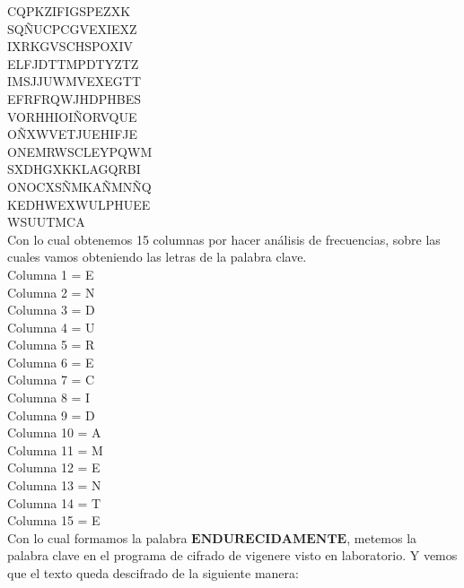 \documentclass[12pt, letterpaper]{article}
\begin{document}
CQPKZIFIGSPEZXK\\
SQÑUCPCGVEXIEXZ\\
IXRKGVSCHSPOXIV\\
ELFJDTTMPDTYZTZ\\
IMSJJUWMVEXEGTT\\
EFRFRQWJHDPHBES\\
VORHHIOIÑORVQUE\\
OÑXWVETJUEHIFJE\\
ONEMRWSCLEYPQWM\\
SXDHGXKKLAGQRBI\\
ONOCXSÑMKAÑMNÑQ\\
KEDHWEXWULPHUEE\\
WSUUTMCA\\

Con lo cual obtenemos 15 columnas por hacer análisis de frecuencias, sobre las cuales vamos obteniendo las letras de la palabra clave.\\

Columna 1 = E\\
Columna 2 = N\\
Columna 3 = D\\
Columna 4 = U\\
Columna 5 = R\\
Columna 6 = E\\
Columna 7 = C\\
Columna 8 = I\\
Columna 9 = D\\
Columna 10 = A\\
Columna 11 = M\\
Columna 12 = E\\
Columna 13 = N\\
Columna 14 = T\\
Columna 15 = E \\

Con lo cual formamos la palabra $\textbf{ENDURECIDAMENTE}$, metemos la palabra clave en el programa de cifrado de vigenere visto en laboratorio. Y vemos que el texto queda descifrado de la siguiente manera:\\
\end{document}
